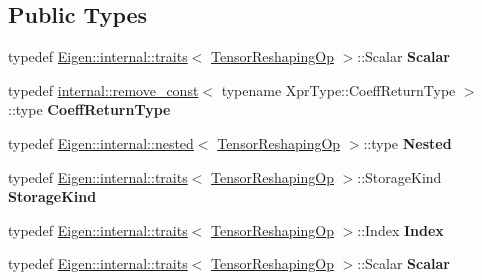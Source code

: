 \subsection*{Public Types}
\begin{DoxyCompactItemize}
\item 
\mbox{\label{class_eigen_1_1_tensor_reshaping_op_a239b4a3ac9f566b97b006e446e963332}} 
typedef \hyperlink{struct_eigen_1_1internal_1_1traits}{Eigen\+::internal\+::traits}$<$ \hyperlink{class_eigen_1_1_tensor_reshaping_op}{Tensor\+Reshaping\+Op} $>$\+::Scalar {\bfseries Scalar}
\item 
\mbox{\label{class_eigen_1_1_tensor_reshaping_op_a1ae17c899e78f607ce2b780f74cda32a}} 
typedef \hyperlink{struct_eigen_1_1internal_1_1remove__const}{internal\+::remove\+\_\+const}$<$ typename Xpr\+Type\+::\+Coeff\+Return\+Type $>$\+::type {\bfseries Coeff\+Return\+Type}
\item 
\mbox{\label{class_eigen_1_1_tensor_reshaping_op_a1ef6ee8ea10f716b899e6a2258e3c540}} 
typedef \hyperlink{struct_eigen_1_1internal_1_1nested}{Eigen\+::internal\+::nested}$<$ \hyperlink{class_eigen_1_1_tensor_reshaping_op}{Tensor\+Reshaping\+Op} $>$\+::type {\bfseries Nested}
\item 
\mbox{\label{class_eigen_1_1_tensor_reshaping_op_a9ce6fb8ca1597a7a6b4a9603d644e9b2}} 
typedef \hyperlink{struct_eigen_1_1internal_1_1traits}{Eigen\+::internal\+::traits}$<$ \hyperlink{class_eigen_1_1_tensor_reshaping_op}{Tensor\+Reshaping\+Op} $>$\+::Storage\+Kind {\bfseries Storage\+Kind}
\item 
\mbox{\label{class_eigen_1_1_tensor_reshaping_op_ad81027a38850d26415401ef5dac63ecf}} 
typedef \hyperlink{struct_eigen_1_1internal_1_1traits}{Eigen\+::internal\+::traits}$<$ \hyperlink{class_eigen_1_1_tensor_reshaping_op}{Tensor\+Reshaping\+Op} $>$\+::Index {\bfseries Index}
\item 
\mbox{\label{class_eigen_1_1_tensor_reshaping_op_a239b4a3ac9f566b97b006e446e963332}} 
typedef \hyperlink{struct_eigen_1_1internal_1_1traits}{Eigen\+::internal\+::traits}$<$ \hyperlink{class_eigen_1_1_tensor_reshaping_op}{Tensor\+Reshaping\+Op} $>$\+::Scalar {\bfseries Scalar}

\end{DoxyCompactItemize}
